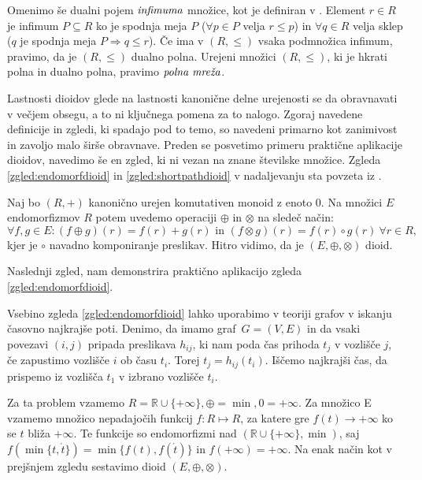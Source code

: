 \documentclass[mat1]{fmfdelo}
\newcommand{\R}{\mathbb{R}}
\newcommand{\pojem}[1]{\ensuremath{\emph{#1}}}
\begin{document}
\begin{opomba}
	Omenimo še dualni pojem \pojem{infimuma} množice, kot je definiran v \cite[str. 10]{bib:Gondran}.
	Element $r\in R$ je infimum $P\subseteq R$ ko je spodnja meja $P$ ($\forall p \in P$ velja $ r \leq p$) in $\forall q \in R$ velja sklep ($q$ je spodnja meja $P \Rightarrow q \leq r$). Če ima v $(R, \leq)$ vsaka podmnožica infimum, pravimo, da je $(R, \leq)$ dualno polna. Urejeni množici $(R, \leq)$, ki je hkrati polna in dualno polna, pravimo \pojem{polna mreža}.
\end{opomba}

Lastnosti dioidov glede na lastnosti kanonične delne urejenosti se da obravnavati v večjem obsegu, a to ni ključnega pomena za to nalogo. Zgoraj navedene definicije in zgledi, ki spadajo pod to temo, so navedeni primarno kot zanimivost in zavoljo malo širše obravnave. Preden se posvetimo primeru praktične aplikacije dioidov, navedimo še en zgled, ki ni vezan na znane številske množice. Zgleda \ref{zgled:endomorfdioid} in \ref{zgled:shortpathdioid} v nadaljevanju sta povzeta iz \cite[poglavje 6.\,2.\,]{bib:Gondran}.

\begin{zgled} \label{zgled:endomorfdioid}
	Naj bo $(R, +)$ kanonično urejen komutativen monoid z enoto $0$. Na množici $E$ endomorfizmov $R$ potem uvedemo operaciji $\oplus$ in $\otimes$ na sledeč način: $$\forall f, g \in E: (f\oplus g)(r) = f(r) + g(r) \text{~in~} (f\otimes g)(r) = f(r) \circ g(r) ~\forall r\in R,$$ kjer je $\circ$ navadno komponiranje preslikav. Hitro vidimo, da je $(E, \oplus, \otimes)$ dioid. 
\end{zgled}

Naslednji zgled, nam demonstrira praktično aplikacijo zgleda \ref{zgled:endomorfdioid}.

\begin{zgled}\label{zgled:shortpathdioid}
	Vsebino zgleda \ref{zgled:endomorfdioid} lahko uporabimo v teoriji grafov v iskanju časovno najkrajše poti. Denimo, da imamo graf~$G = (V, E)$ in da vsaki povezavi $(i, j)$ pripada preslikava $h_{ij}$, ki nam poda čas prihoda $t_j$ v vozlišče $j$, če zapustimo vozlišče $i$ ob času $t_i$. Torej $ t_j = h_{ij}(t_i)$. Iščemo najkrajši čas, da prispemo iz vozlišča $t_1$ v izbrano vozlišče $t_i$.
	
	Za ta problem vzamemo $R = \R\cup\{+\infty\}, \oplus = \min, 0 = +\infty$. Za množico E vzamemo množico nepadajočih funkcij $f: R \mapsto R$, za katere gre $f(t) \to +\infty$ ko se $t$ bliža $+\infty$. Te funkcije so endomorfizmi nad $(\R\cup\{+\infty\}, \min)$, saj $f(\min\{t, \acute{t}\}) = \min\{f(t),f(\acute{t})\}$ in $f(+\infty) = +\infty$. Na enak način kot v prejšnjem zgledu sestavimo dioid $(E, \oplus, \otimes)$.
\end{zgled}
\end{document}

